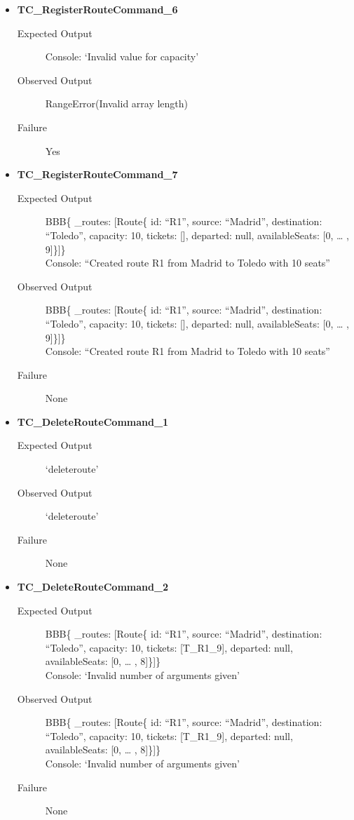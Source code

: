 \documentclass[11pt]{article}
\begin{document}
\begin{itemize}
\item \textbf{TC\_RegisterRouteCommand\_6}
\begin{description}
\item[{Expected Output}] Console: ‘Invalid value for capacity’
\item[{Observed Output}] RangeError(Invalid array length)
\item[{Failure}] Yes
\end{description}

\item \textbf{TC\_RegisterRouteCommand\_7}
\begin{description}
\item[{Expected Output}] BBB\{ \_routes: [Route\{ id: “R1”, source: “Madrid”, destination: “Toledo”, capacity: 10,  tickets: [], departed: null, availableSeats: [0, … , 9]\}]\}\\
Console: “Created route R1 from Madrid to Toledo with 10 seats”
\item[{Observed Output}] BBB\{ \_routes: [Route\{ id: “R1”, source: “Madrid”, destination: “Toledo”, capacity: 10,  tickets: [], departed: null, availableSeats: [0, … , 9]\}]\}\\
Console: “Created route R1 from Madrid to Toledo with 10 seats”
\item[{Failure}] None
\end{description}

\item \textbf{TC\_DeleteRouteCommand\_1}
\begin{description}
\item[{Expected Output}] ‘deleteroute’
\item[{Observed Output}] ‘deleteroute’
\item[{Failure}] None
\end{description}

\item \textbf{TC\_DeleteRouteCommand\_2}
\begin{description}
\item[{Expected Output}] BBB\{ \_routes: [Route\{ id: “R1”, source: “Madrid”, destination: “Toledo”, capacity: 10,  tickets: [T\_R1\_9], departed: null, availableSeats: [0, … , 8]\}]\}\\
Console: ‘Invalid number of arguments given’
\item[{Observed Output}] BBB\{ \_routes: [Route\{ id: “R1”, source: “Madrid”, destination: “Toledo”, capacity: 10,  tickets: [T\_R1\_9], departed: null, availableSeats: [0, … , 8]\}]\}\\
Console: ‘Invalid number of arguments given’
\item[{Failure}] None
\end{description}


\end{itemize}
\end{document}

